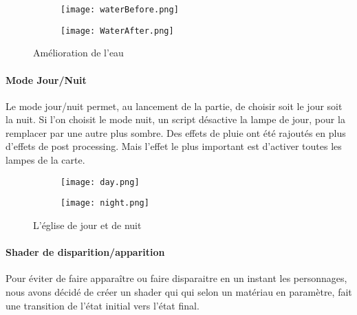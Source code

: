         
        \begin{figure}[hbt!]
            \begin{subfigure}[b]{0.49\textwidth}
                \texttt{[image: waterBefore.png]}
            \end{subfigure}
            \begin{subfigure}[b]{0.49\textwidth}
                \texttt{[image: WaterAfter.png]}
            \end{subfigure}
            \caption{Amélioration de l'eau}
        \end{figure}
        \FloatBarrier



        \paragraph{Mode Jour/Nuit}
        Le mode jour/nuit permet, au lancement de la partie,
        de choisir soit le jour soit la nuit. Si l'on choisit le mode nuit, un script désactive la lampe de jour,
        pour la remplacer par une autre plus sombre. Des effets de pluie ont été rajoutés en plus d'effets de post processing.
        Mais l'effet le plus important est d'activer toutes les lampes de la carte.
    

        \begin{figure}[hbt!]
            \begin{subfigure}[b]{0.49\textwidth}
                \texttt{[image: day.png]}
            \end{subfigure}
            \begin{subfigure}[b]{0.5\textwidth}
                \texttt{[image: night.png]}
            \end{subfigure}
            \caption{L'église de jour et de nuit}
        \end{figure}
        \FloatBarrier

        \paragraph{Shader de disparition/apparition}
        Pour éviter de faire apparaître ou faire disparaitre en un instant les personnages, nous avons décidé de créer un shader qui qui selon un matériau en paramètre, 
        fait une transition de l'état initial vers l'état final. 
    

